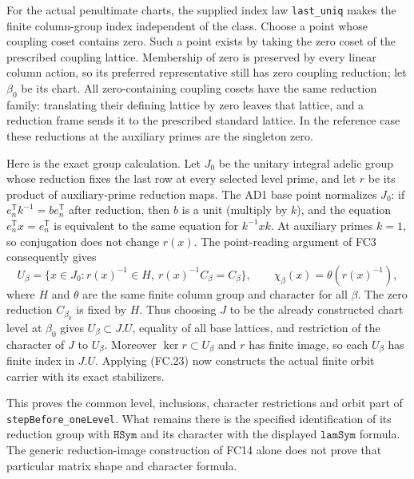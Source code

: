 \documentclass[11pt,a4paper]{article}
\numberwithin{equation}{section}
\theoremstyle{remark}\newtheorem{remark}[theorem]{Remark}
\begin{document}
For the actual penultimate charts, the supplied index law
\texttt{last\_\allowbreak uniq} makes the finite column-group index independent
of the class. Choose a point whose coupling coset contains zero.
Such a point exists by taking the zero coset of the prescribed coupling
lattice. Membership of zero is preserved by every linear column action,
so its preferred representative still has zero coupling reduction;
let $\beta_0$ be its chart. All zero-containing coupling cosets have
the same reduction family: translating their defining lattice by zero
leaves that lattice, and a reduction frame sends it to the prescribed
standard lattice. In the reference case these reductions at the auxiliary
primes are the singleton zero.

Here is the exact group calculation. Let $J_0$ be the unitary integral
adelic group whose reduction fixes the last row at every selected level
prime, and let $r$ be its product of auxiliary-prime reduction maps.
The AD1 base point normalizes $J_0$: if
$e_n^{\mathsf T}k^{-1}=b e_n^{\mathsf T}$ after reduction, then
$b$ is a unit (multiply by $k$), and the equation
$e_n^{\mathsf T}x=e_n^{\mathsf T}$ is equivalent to the same
equation for $k^{-1}xk$. At auxiliary primes $k=1$, so conjugation
does not change $r(x)$. The point-reading argument of FC3 consequently
gives
\[
 U_\beta=\{x\in J_0:r(x)^{-1}\in H,
                   \ r(x)^{-1}C_\beta=C_\beta\},
 \qquad \chi_\beta(x)=\theta(r(x)^{-1}),             \tag{FC.23a}
\]
where $H$ and $\theta$ are the same finite column group and character
for all $\beta$. The zero reduction $C_{\beta_0}$ is fixed by $H$.
Thus choosing $J$ to be the already constructed chart level at
$\beta_0$ gives $U_\beta\subset J.U$, equality of all base
lattices, and restriction of the character of $J$ to $U_\beta$.
Moreover $\ker r\subset U_\beta$ and $r$ has finite image, so
each $U_\beta$ has finite index in $J.U$. Applying (FC.23) now
constructs the actual finite orbit carrier with its exact stabilizers.

This proves the common level, inclusions, character restrictions and
orbit part of \texttt{stepBefore\_\allowbreak oneLevel}. What remains there is
the specified identification of its reduction group with
$\texttt{HSym}$ and its character with the displayed
$\texttt{lamSym}$ formula. The generic reduction-image construction
of FC14 alone does not prove that particular matrix shape and character
formula.
\end{document}
